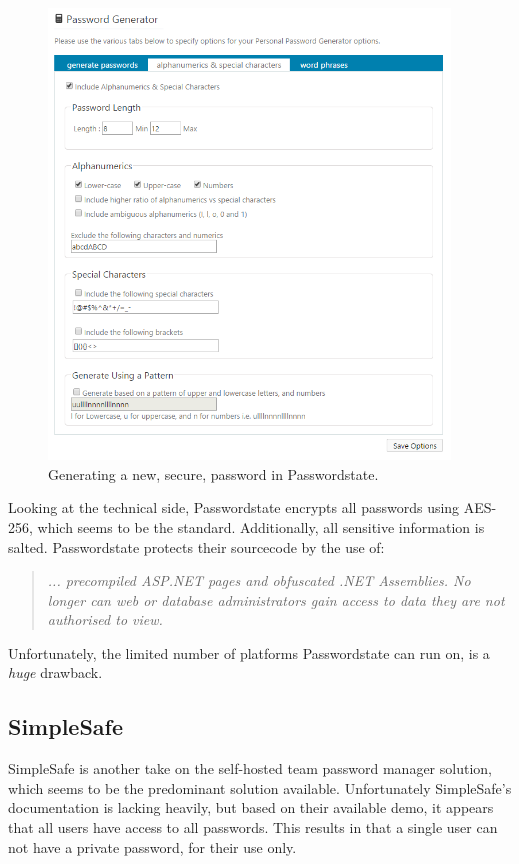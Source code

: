 			\begin{figure}[htbp]
				\centering
				\includegraphics[width=0.95\textwidth]{figures/analysis/passwordstate_newpassword_passwordgen.png}
				\caption{Generating a new, secure, password in Passwordstate. }
				\label{fig:passwordstate_newpassword_passwordgen}
			\end{figure}

			Looking at the technical side, Passwordstate encrypts all passwords using AES-256\cite{passwordstate_security}, which seems to be the standard. Additionally, all sensitive information is salted. Passwordstate protects their sourcecode by the use of:
			\begin{quote}
				\emph{... precompiled ASP.NET pages and obfuscated .NET Assemblies. No longer can web or database administrators gain access to data they are not authorised to view. }\cite{passwordstate_security}
			\end{quote}

			Unfortunately, the limited number of platforms Passwordstate can run on, is a \emph{huge} drawback.

		\subsection*{SimpleSafe}
			SimpleSafe\cite{simplesafe} is another take on the self-hosted team password manager solution, which seems to be the predominant solution available. Unfortunately SimpleSafe's documentation is lacking heavily, but based on their available demo, it appears that all users have access to all passwords. This results in that a single user can not have a private password, for their use only.

